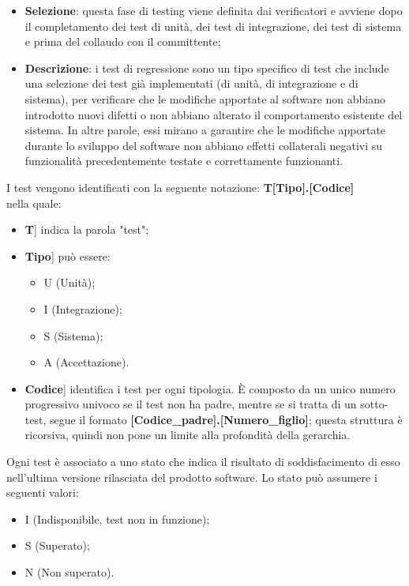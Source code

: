 \documentclass[10pt, a4paper]{article}
\begin{document}
\begin{itemize}
    \item \textbf{Selezione}: questa fase di testing viene definita dai verificatori e avviene dopo il completamento dei test di unità, dei test di integrazione, dei test di sistema e prima del collaudo con il committente;
    \item \textbf{Descrizione}: i test di regressione sono un tipo specifico di test che include una selezione dei test già implementati (di unità, di integrazione e di sistema), per verificare che le modifiche apportate al software non abbiano introdotto nuovi difetti o non abbiano alterato il comportamento esistente del sistema. In altre parole, essi mirano a garantire che le modifiche apportate durante lo sviluppo del software non abbiano effetti collaterali negativi su funzionalità precedentemente testate e correttamente funzionanti.
\end{itemize}



I test vengono identificati con la seguente notazione:
\textbf{T[Tipo].[Codice]}\\
nella quale:
\begin{itemize}
\item \lbrack \textbf{T}] indica la parola "test";
\item \lbrack \textbf{Tipo}] può essere:
    \begin{itemize}
	    \item U (Unità);
	    \item I (Integrazione);
	    \item S (Sistema);
        \item A (Accettazione).
    \end{itemize}
\item \lbrack \textbf{Codice}] identifica i test per ogni tipologia. È composto da un unico numero progressivo univoco se il test non ha padre, mentre se si tratta di un sotto-test, segue il formato \textbf{[Codice\_padre].[Numero\_figlio]}; questa struttura è ricorsiva, quindi non pone un limite alla profondità della gerarchia.
\end{itemize}

Ogni test è associato a uno stato che indica il risultato di soddisfacimento di esso nell'ultima versione rilasciata del prodotto software. Lo stato può assumere i seguenti valori:
\begin{itemize}
    \item I (Indisponibile, test non in funzione);
    \item S (Superato);
    \item N (Non superato).
\end{itemize}
\end{document}
